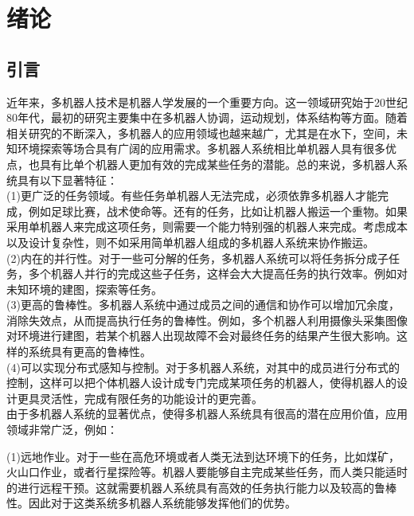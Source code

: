 
\chapter{绪论}
\label{chap:intro}

\section{引言}
近年来，多机器人技术是机器人学发展的一个重要方向。这一领域研究始于20世纪80年代，最初的研究主要集中在多机器人协调，运动规划，体系结构等方面。随着相关研究的不断深入，多机器人的应用领域也越来越广，尤其是在水下，空间，未知环境探索等场合具有广阔的应用需求。多机器人系统相比单机器人具有很多优点，也具有比单个机器人更加有效的完成某些任务的潜能。总的来说，多机器人系统具有以下显著特征\supercite{蔡自兴}：\\
	
	(1)更广泛的任务领域。有些任务单机器人无法完成，必须依靠多机器人才能完成，例如足球比赛，战术使命等。还有的任务，比如让机器人搬运一个重物。如果采用单机器人来完成这项任务，则需要一个能力特别强的机器人来完成。考虑成本以及设计复杂性，则不如采用简单机器人组成的多机器人系统来协作搬运。\\
	
	(2)内在的并行性。对于一些可分解的任务，多机器人系统可以将任务拆分成子任务，多个机器人并行的完成这些子任务，这样会大大提高任务的执行效率。例如对未知环境的建图，探索等任务。\\
	
	(3)更高的鲁棒性。多机器人系统中通过成员之间的通信和协作可以增加冗余度，消除失效点，从而提高执行任务的鲁棒性。例如，多个机器人利用摄像头采集图像对环境进行建图，若某个机器人出现故障不会对最终任务的结果产生很大影响。这样的系统具有更高的鲁棒性。\\
	
	(4)可以实现分布式感知与控制。对于多机器人系统，对其中的成员进行分布式的控制，这样可以把个体机器人设计成专门完成某项任务的机器人，使得机器人的设计更具灵活性，完成有限任务的功能设计的更完善。\\
	
由于多机器人系统的显著优点，使得多机器人系统具有很高的潜在应用价值，应用领域非常广泛，例如：

	(1)远地作业。对于一些在高危环境或者人类无法到达环境下的任务，比如煤矿，火山口作业，或者行星探险等。机器人要能够自主完成某些任务，而人类只能适时的进行远程干预。这就需要机器人系统具有高效的任务执行能力以及较高的鲁棒性。因此对于这类系统多机器人系统能够发挥他们的优势。\\
	
